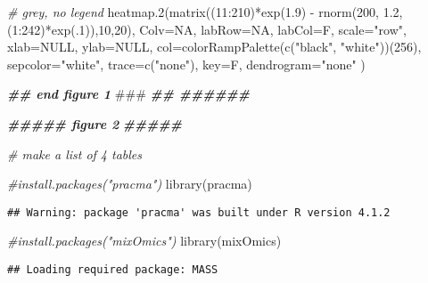 \documentclass[
]{article}
\newenvironment{Shaded}{\begin{snugshade}}{\end{snugshade}}
\newcommand{\AlertTok}[1]{\textcolor[rgb]{0.94,0.16,0.16}{#1}}
\newcommand{\AttributeTok}[1]{\textcolor[rgb]{0.77,0.63,0.00}{#1}}
\newcommand{\CommentTok}[1]{\textcolor[rgb]{0.56,0.35,0.01}{\textit{#1}}}
\newcommand{\ConstantTok}[1]{\textcolor[rgb]{0.00,0.00,0.00}{#1}}
\newcommand{\DecValTok}[1]{\textcolor[rgb]{0.00,0.00,0.81}{#1}}
\newcommand{\DocumentationTok}[1]{\textcolor[rgb]{0.56,0.35,0.01}{\textbf{\textit{#1}}}}
\newcommand{\FloatTok}[1]{\textcolor[rgb]{0.00,0.00,0.81}{#1}}
\newcommand{\FunctionTok}[1]{\textcolor[rgb]{0.00,0.00,0.00}{#1}}
\newcommand{\NormalTok}[1]{#1}
\newcommand{\SpecialCharTok}[1]{\textcolor[rgb]{0.00,0.00,0.00}{#1}}
\newcommand{\StringTok}[1]{\textcolor[rgb]{0.31,0.60,0.02}{#1}}
\begin{document}
\begin{Shaded}
\begin{Highlighting}[]
\CommentTok{\# grey, no legend}
\FunctionTok{heatmap.2}\NormalTok{(}\FunctionTok{matrix}\NormalTok{((}\DecValTok{11}\SpecialCharTok{:}\DecValTok{210}\NormalTok{)}\SpecialCharTok{*}\FunctionTok{exp}\NormalTok{(}\FloatTok{1.9}\NormalTok{) }\SpecialCharTok{{-}}  \FunctionTok{rnorm}\NormalTok{(}\DecValTok{200}\NormalTok{, }\FloatTok{1.2}\NormalTok{, (}\DecValTok{1}\SpecialCharTok{:}\DecValTok{242}\NormalTok{)}\SpecialCharTok{*}\FunctionTok{exp}\NormalTok{(.}\DecValTok{1}\NormalTok{)),}\DecValTok{10}\NormalTok{,}\DecValTok{20}\NormalTok{),}
          \AttributeTok{Colv=}\ConstantTok{NA}\NormalTok{, }\AttributeTok{labRow=}\ConstantTok{NA}\NormalTok{, }\AttributeTok{labCol=}\NormalTok{F, }\AttributeTok{scale=}\StringTok{"row"}\NormalTok{, }\AttributeTok{xlab=}\ConstantTok{NULL}\NormalTok{, }\AttributeTok{ylab=}\ConstantTok{NULL}\NormalTok{,}
          \AttributeTok{col=}\FunctionTok{colorRampPalette}\NormalTok{(}\FunctionTok{c}\NormalTok{(}\StringTok{"black"}\NormalTok{, }\StringTok{"white"}\NormalTok{))(}\DecValTok{256}\NormalTok{), }
        \AttributeTok{sepcolor=}\StringTok{"white"}\NormalTok{, }\AttributeTok{trace=}\FunctionTok{c}\NormalTok{(}\StringTok{"none"}\NormalTok{), }\AttributeTok{key=}\NormalTok{F, }\AttributeTok{dendrogram=}\StringTok{"none"}\NormalTok{ )}

\DocumentationTok{\#\# end figure 1 }\AlertTok{\#\#\#}
\DocumentationTok{\#\# \#\#\#\#\#\#}


\DocumentationTok{\#\#\#\#\# figure 2}
\DocumentationTok{\#\#\#\#\# }

\CommentTok{\# make a list of 4 tables }

\CommentTok{\#install.packages("pracma")}
\FunctionTok{library}\NormalTok{(pracma)}
\end{Highlighting}
\end{Shaded}

\begin{verbatim}
## Warning: package 'pracma' was built under R version 4.1.2
\end{verbatim}

\begin{Shaded}
\begin{Highlighting}[]
\CommentTok{\#install.packages("mixOmics")}
\FunctionTok{library}\NormalTok{(mixOmics)}
\end{Highlighting}
\end{Shaded}

\begin{verbatim}
## Loading required package: MASS
\end{verbatim}
\end{document}

